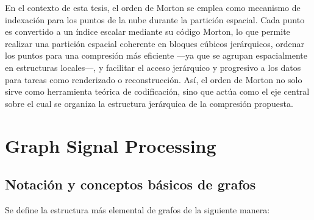    En el contexto de esta tesis, el orden de Morton se emplea como mecanismo de indexación para los puntos de la nube durante la partición espacial. Cada punto es convertido a un índice escalar mediante su código Morton, lo que permite realizar una partición espacial coherente en bloques cúbicos jerárquicos, ordenar los puntos para una compresión más eficiente —ya que se agrupan espacialmente en estructuras locales—, y facilitar el acceso jerárquico y progresivo a los datos para tareas como renderizado o reconstrucción. Así, el orden de Morton no solo sirve como herramienta teórica de codificación, sino que actúa como el eje central sobre el cual se organiza la estructura jerárquica de la compresión propuesta.
    
    
    
        

\section{Graph Signal Processing \cite{ortega2022gsp}} \label{sec: gsp}
    \subsection{Notación y conceptos básicos de grafos}


    Se define la estructura más elemental de grafos de la siguiente manera:


